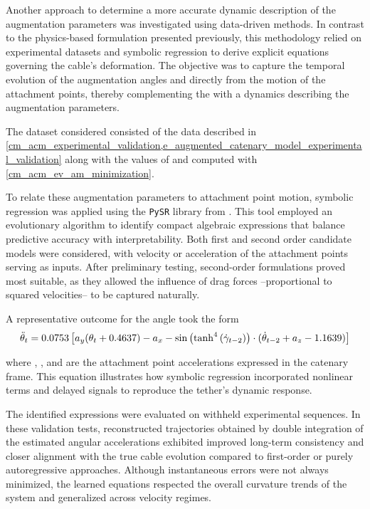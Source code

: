 Another approach to determine a more accurate dynamic description of the augmentation parameters
was investigated using data-driven methods. In contrast to the physics-based formulation presented
previously, this methodology relied on experimental datasets and symbolic regression to derive
explicit equations governing the cable's deformation. The objective was to capture the temporal
evolution of the augmentation angles \scal{\theta} and \scal{\gamma} directly from the motion of
the attachment points, thereby complementing the \augmentedmodel{} with a dynamics describing the
augmentation parameters.

The dataset considered consisted of the data described in
\cref{cm_acm_experimental_validation,e_augmented_catenary_model_experimental_validation} along with
the values of \scal{\theta} and \scal{\gamma} computed with \cref{cm_acm_ev_am_minimization}.

To relate these augmentation parameters to attachment point motion, symbolic regression was applied
using the \texttt{PySR} library from \cite{cranmerInterpretableMachineLearning2023}. This tool
employed an evolutionary algorithm to identify compact algebraic expressions that balance
predictive accuracy with interpretability. Both first and second order candidate models were
considered, with velocity or acceleration of the attachment points serving as inputs. After
preliminary testing, second-order formulations proved most suitable, as they allowed the influence
of drag forces --proportional to squared velocities-- to be captured naturally.

A representative outcome for the angle  took the form
\begin{align}
	{\ddot{\theta}}_{t} = \num{0.0753} \left[ {a}_{y} ({\theta}_{t} + \num{0.4637}) - {a}_{x} - \sin{\left(\tanh^4{\left(\ensuremath{{\dot{\gamma}}_{t-2}}\right)}\right)}\cdot({\dot{\theta}}_{t-2} + {a}_{z}- \num{1.1639}) \right]
\end{align}

where , , and  are the attachment point accelerations
expressed in the catenary frame. This equation illustrates how symbolic regression incorporated
nonlinear terms and delayed signals to reproduce the tether's dynamic response.

The identified expressions were evaluated on withheld experimental sequences. In these validation
tests, reconstructed trajectories obtained by double integration of the estimated angular
accelerations exhibited improved long-term consistency and closer alignment with the true cable
evolution compared to first-order or purely autoregressive approaches. Although instantaneous
errors were not always minimized, the learned equations respected the overall curvature trends of
the system and generalized across velocity regimes.


